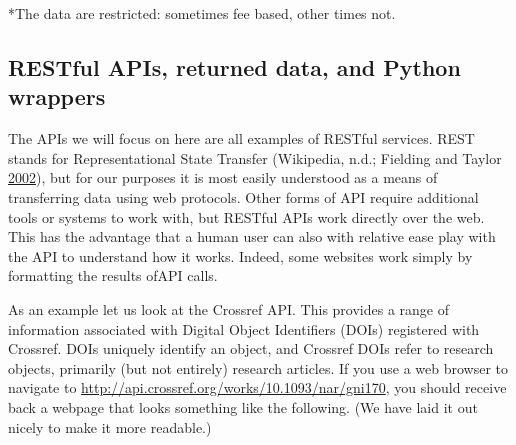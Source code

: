 \documentclass[]{krantz}
\begin{document}
*The data are restricted: sometimes fee based, other times not.

\subsection{RESTful APIs, returned data, and Python
wrappers}\label{sec:4-3.2}

The APIs we will focus on here are all examples of RESTful services.
REST stands for Representational State Transfer (Wikipedia, n.d.;
Fielding and Taylor
\protect\hyperlink{ref-fielding2002principled}{2002}), but for our
purposes it is most easily understood as a means of transferring data
using web protocols. Other forms of API require additional tools or
systems to work with, but RESTful APIs work directly over the web. This
has the advantage that a human user can also with relative ease play
with the API to understand how it works. Indeed, some websites work
simply by formatting the results ofAPI calls.

As an example let us look at the Crossref API. This provides a range of
information associated with Digital Object Identifiers (DOIs) registered
with Crossref. DOIs uniquely identify an object, and Crossref DOIs refer
to research objects, primarily (but not entirely) research articles. If
you use a web browser to navigate to
\url{http://api.crossref.org/works/10.1093/nar/gni170}, you should
receive back a webpage that looks something like the following. (We have
laid it out nicely to make it more readable.)
\end{document}
